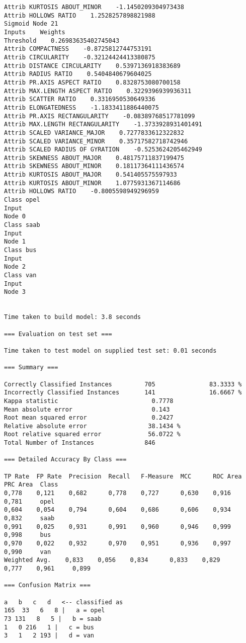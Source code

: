 \documentclass[
	article,			%
	11pt,				%
	oneside,			%
	a4paper,			%
	english,			%
	brazil,				%
	sumario=tradicional
	]{abntex2}
\begin{document}
\begin{lstlisting}
Attrib KURTOSIS ABOUT_MINOR    -1.1450209304973438
Attrib HOLLOWS RATIO    1.2528257898821988
Sigmoid Node 21
Inputs    Weights
Threshold    0.26983635402745043
Attrib COMPACTNESS    -0.8725812744753191
Attrib CIRCULARITY    -0.32124424413380875
Attrib DISTANCE CIRCULARITY    0.5397136918383689
Attrib RADIUS RATIO    0.5404840679604025
Attrib PR.AXIS ASPECT RATIO    0.8328753080700158
Attrib MAX.LENGTH ASPECT RATIO    0.3229396939936311
Attrib SCATTER RATIO    0.3316950530649336
Attrib ELONGATEDNESS    -1.1833411886440075
Attrib PR.AXIS RECTANGULARITY    -0.08389768517781099
Attrib MAX.LENGTH RECTANGULARITY    -1.3733928931401491
Attrib SCALED VARIANCE_MAJOR    0.7277833612322832
Attrib SCALED VARIANCE_MINOR    0.35717582718742946
Attrib SCALED RADIUS OF GYRATION    -0.5253624205462949
Attrib SKEWNESS ABOUT_MAJOR    0.48175711837199475
Attrib SKEWNESS ABOUT_MINOR    0.18117364111436574
Attrib KURTOSIS ABOUT_MAJOR    0.541405575597933
Attrib KURTOSIS ABOUT_MINOR    1.0775931367114686
Attrib HOLLOWS RATIO    -0.8005598949296959
Class opel
Input
Node 0
Class saab
Input
Node 1
Class bus
Input
Node 2
Class van
Input
Node 3


Time taken to build model: 3.8 seconds

=== Evaluation on test set ===

Time taken to test model on supplied test set: 0.01 seconds

=== Summary ===

Correctly Classified Instances         705               83.3333 %
Incorrectly Classified Instances       141               16.6667 %
Kappa statistic                          0.7778
Mean absolute error                      0.143 
Root mean squared error                  0.2427
Relative absolute error                 38.1434 %
Root relative squared error             56.0722 %
Total Number of Instances              846     

=== Detailed Accuracy By Class ===

TP Rate  FP Rate  Precision  Recall   F-Measure  MCC      ROC Area  PRC Area  Class
0,778    0,121    0,682      0,778    0,727      0,630    0,916     0,781     opel
0,604    0,054    0,794      0,604    0,686      0,606    0,934     0,832     saab
0,991    0,025    0,931      0,991    0,960      0,946    0,999     0,998     bus
0,970    0,022    0,932      0,970    0,951      0,936    0,997     0,990     van
Weighted Avg.    0,833    0,056    0,834      0,833    0,829      0,777    0,961     0,899     

=== Confusion Matrix ===

a   b   c   d   <-- classified as
165  33   6   8 |   a = opel
73 131   8   5 |   b = saab
1   0 216   1 |   c = bus
3   1   2 193 |   d = van
\end{lstlisting}
\end{document}
